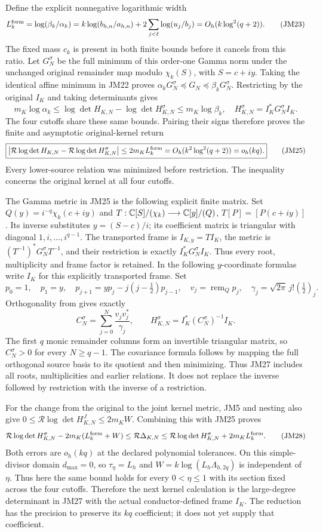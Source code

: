 \documentclass[11pt]{article}
\begin{document}
Define the explicit nonnegative logarithmic width
\[
 L_k^{\rm form}=\log(\beta_k/\alpha_k)
 =k\log(b_{h,n}/a_{h,n})
   +2\sum_{j<\ell}\log(u_j/b_j)
 =O_h(k\log^2(q+2)).\tag{JM23}
\]
The fixed mass $c_k$ is present in both finite bounds before it
cancels from this ratio. Let $G_N^\sigma$ be the full minimum of
this order-one Gamma norm under the unchanged original remainder
map modulo $\chi_k(S)$, with $S=c+iy$.
Taking the identical affine minimum in JM22 proves
$\alpha_kG_N^\sigma\preceq G_N\preceq\beta_kG_N^\sigma$.
Restricting by the original $I_K$ and taking determinants gives
\[
 m_K\log\alpha_k\le
 \log\det H_{K,N}-\log\det H_{K,N}^\sigma
 \le m_K\log\beta_k,
 \quad H_{K,N}^\sigma=I_K^*G_N^\sigma I_K.\tag{JM24}
\]
The four cutoffs share these same bounds. Pairing their signs
therefore proves the finite and asymptotic original-kernel return
\[
 \boxed{\left|\mathcal R\log\det H_{K,N}
 -\mathcal R\log\det H_{K,N}^\sigma\right|
 \le2m_KL_k^{\rm form}=O_h(k^2\log^2(q+2))=o_h(kq).}
 \tag{JM25}
\]
Every lower-source relation was minimized before restriction.
The inequality concerns the original kernel at all four cutoffs.

The Gamma metric in JM25 is the following explicit finite matrix.
Set $Q(y)=i^{-q}\chi_k(c+iy)$ and
$T:\mathbb C[S]/(\chi_k)\longrightarrow\mathbb C[y]/(Q)$,
$T[P]=[P(c+iy)]$. Its inverse substitutes $y=(S-c)/i$;
its coefficient matrix is triangular with diagonal $1,i,\ldots,i^{q-1}$.
The transported frame is $I_{K,y}=TI_K$, the metric is
$(T^{-1})^*G_N^\sigma T^{-1}$, and their restriction is exactly
$I_K^*G_N^\sigma I_K$. Thus every root, multiplicity and frame
factor is retained. In the following $y$-coordinate formulas write
$I_K$ for this explicitly transported frame. Set
\[
 p_0=1,\quad p_1=y,\quad
 p_{j+1}=yp_j-j(j-\tfrac12)p_{j-1},\quad
 v_j=\operatorname{rem}_{Q}p_j,\quad
 \gamma_j=\sqrt{2\pi}\,j!(\tfrac12)_j.
 \tag{JM26}
\]
Orthogonality from \cite{mrjm:MP} gives exactly
\[
 C_N^\sigma=\sum_{j=0}^N\frac{v_jv_j^*}{\gamma_j},\qquad
 H_{K,N}^\sigma=I_K^*(C_N^\sigma)^{-1}I_K.\tag{JM27}
\]
The first $q$ monic remainder columns form an invertible triangular
matrix, so $C_N^\sigma>0$ for every $N\ge q-1$. The covariance
formula follows by mapping the full orthogonal source basis to its
quotient and then minimizing. Thus JM27 includes all roots,
multiplicities and earlier relations. It does not replace the
inverse followed by restriction with the inverse of a restriction.

For the change from the original to the joint kernel metric,
JM5 and nesting also give
$0\le\mathcal R\log\det H_{K,N}^J\le2m_KW$.
Combining this with JM25 proves
\[
 \mathcal R\log\det H_{K,N}^\sigma-2m_K(L_k^{\rm form}+W)
 \le\mathcal R\Delta_{K,N}
 \le\mathcal R\log\det H_{K,N}^\sigma+2m_KL_k^{\rm form}.
 \tag{JM28}
\]
Both errors are $o_h(kq)$ at the declared polynomial tolerances.
On this simple-divisor domain $d_{\max}=0$, so
$\tau_\eta=L_h$ and $W=k\log(L_h\Lambda_{h,2q})$ is independent of
$\eta$. Thus here the same bound holds for every $0<\eta\le1$
with its section fixed across the four cutoffs.
Therefore the next kernel calculation is the large-degree
determinant in JM27 with the actual conductor-defined frame $I_K$.
The reduction has the precision to preserve its $kq$ coefficient;
it does not yet supply that coefficient.
\end{document}
